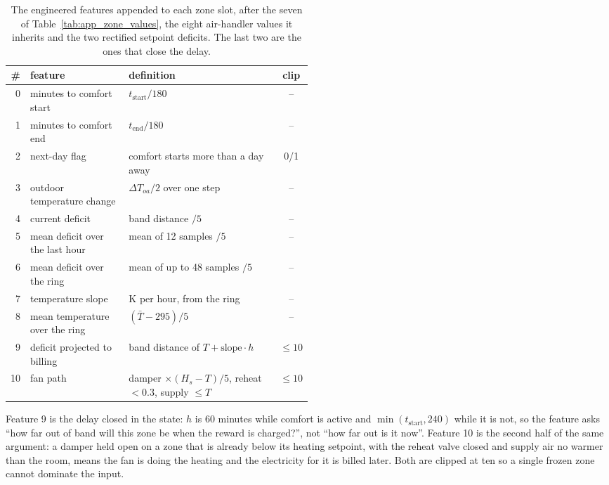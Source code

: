 \documentclass{article}
\begin{document}
\begin{table}[h!]
\centering
\small
\setlength{\tabcolsep}{4pt}
\begin{tabular}{@{}rlp{0.5\linewidth}c@{}}
\toprule
\# & feature & definition & clip \\
\midrule
0 & minutes to comfort start & $t_{\text{start}}/180$ & -- \\
1 & minutes to comfort end & $t_{\text{end}}/180$ & -- \\
2 & next-day flag & comfort starts more than a day away & 0/1 \\
3 & outdoor temperature change & $\Delta T_{oa}/2$ over one step & -- \\
4 & current deficit & band distance $/5$ & -- \\
5 & mean deficit over the last hour & mean of 12 samples $/5$ & -- \\
6 & mean deficit over the ring & mean of up to 48 samples $/5$ & -- \\
7 & temperature slope & K per hour, from the ring & -- \\
8 & mean temperature over the ring & $(\bar T-295)/5$ & -- \\
9 & deficit projected to billing & band distance of $T+\text{slope}\cdot h$ & $\le 10$ \\
10 & fan path & damper $\times(H_s-T)/5$, reheat $<0.3$, supply $\le T$ & $\le 10$ \\
\bottomrule
\end{tabular}
\vspace{4pt}
\caption{The engineered features appended to each zone slot, after the seven of Table~\ref{tab:app_zone_values}, the eight air-handler values it inherits and the two rectified setpoint deficits. The last two are the ones that close the delay.}
\label{tab:app_features}
\end{table}

Feature 9 is the delay closed in the state: $h$ is 60 minutes while comfort is active and $\min(t_{\text{start}},240)$ while it is not, so the feature asks ``how far out of band will this zone be when the reward is charged?'', not ``how far out is it now''. Feature 10 is the second half of the same argument: a damper held open on a zone that is already below its heating setpoint, with the reheat valve closed and supply air no warmer than the room, means the fan is doing the heating and the electricity for it is billed later. Both are clipped at ten so a single frozen zone cannot dominate the input.
\end{document}
